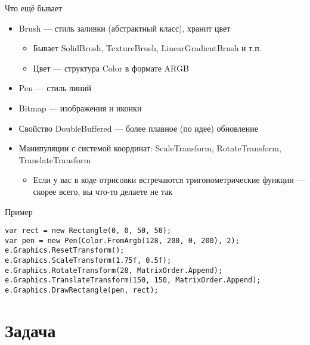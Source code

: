 \documentclass{../../slides-style}
\begin{document}
    \begin{frame}{Что ещё бывает}
        \begin{itemize}
            \item Brush --- стиль заливки (абстрактный класс), хранит цвет
            \begin{itemize}
                \item Бывает SolidBrush, TextureBrush, LinearGradientBrush и т.п.
                \item Цвет --- структура Color в формате ARGB
            \end{itemize}
            \item Pen --- стиль линий
            \item Bitmap --- изображения и иконки
            \item Свойство DoubleBuffered --- более плавное (по идее) обновление
            \item Манипуляции с системой координат: ScaleTransform, RotateTransform, TranslateTransform
            \begin{itemize}
                \item Если у вас в коде отрисовки встречаются тригонометрические функции --- скорее всего, вы что-то делаете не так
            \end{itemize}
        \end{itemize}
    \end{frame}

    \begin{frame}[fragile]{Пример}
        \begin{verbatim}
var rect = new Rectangle(0, 0, 50, 50);
var pen = new Pen(Color.FromArgb(128, 200, 0, 200), 2);
e.Graphics.ResetTransform();
e.Graphics.ScaleTransform(1.75f, 0.5f);
e.Graphics.RotateTransform(28, MatrixOrder.Append);
e.Graphics.TranslateTransform(150, 150, MatrixOrder.Append);
e.Graphics.DrawRectangle(pen, rect);
        \end{verbatim}
    \end{frame}

    \section{Задача}
\end{document}
